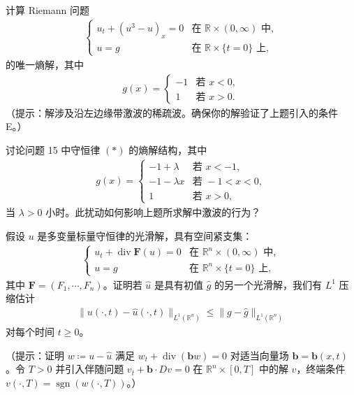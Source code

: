 \documentclass[../../main.tex]{subfiles}
\begin{document}
\begin{exercise}[非凸通量的显式解。]\label{exercise:ch11-15}计算 Riemann 问题
\begin{align}
\begin{cases}
u_t+(u^3-u)_x=0 & \text{在 } \mathbb{R}\times(0,\infty) \text{ 中},\\
u=g & \text{在 } \mathbb{R}\times\{t=0\} \text{ 上},
\end{cases}
\label{align:ch11-非凸通量Riemann}
\end{align}
的唯一熵解，其中
\begin{align*}
g(x)=\begin{cases}-1 & \text{若 } x<0,\\ 1 & \text{若 } x>0.\end{cases}
\end{align*}
（提示：解涉及沿左边缘带激波的稀疏波。确保你的解验证了上题引入的条件 E。）
\end{exercise}

\begin{exercise}[续上题。]\label{exercise:ch11-16}讨论问题 15 中守恒律 $(*)$ 的熵解结构，其中
\begin{align*}
g(x)=\begin{cases}
-1+\lambda & \text{若 } x<-1,\\
-1-\lambda x & \text{若 } -1<x<0,\\
1 & \text{若 } x>0,
\end{cases}
\end{align*}
当 $\lambda>0$ 小时。此扰动如何影响上题所求解中激波的行为？
\end{exercise}

\begin{exercise}\label{exercise:ch11-17}
假设 $u$ 是多变量标量守恒律的光滑解，具有空间紧支集：
\begin{align*}
\begin{cases}
u_t+\operatorname{div}\mathbf{F}(u)=0 & \text{在 } \mathbb{R}^n\times(0,\infty) \text{ 中},\\
u=g & \text{在 } \mathbb{R}^n\times\{t=0\} \text{ 上},
\end{cases}
\end{align*}
其中 $\mathbf{F}=(F_1,\cdots,F_n)$。证明若 $\widehat{u}$ 是具有初值 $\widehat{g}$ 的另一个光滑解，我们有 $L^1$ 压缩估计
\begin{align*}
\|u(\cdot,t)-\widehat{u}(\cdot,t)\|_{L^1(\mathbb{R}^n)}\leqslant\|g-\widehat{g}\|_{L^1(\mathbb{R}^n)}
\end{align*}
对每个时间 $t\geqslant 0$。

（提示：证明 $w\coloneqq u-\widehat{u}$ 满足 $w_t+\operatorname{div}(\mathbf{b}w)=0$ 对适当向量场 $\mathbf{b}=\mathbf{b}(x,t)$。令 $T>0$ 并引入伴随问题 $v_t+\mathbf{b}\cdot Dv=0$ 在 $\mathbb{R}^n\times[0,T]$ 中的解 $v$，终端条件 $v(\cdot,T)=\operatorname{sgn}(w(\cdot,T))$。）
\end{exercise}
\end{document}
